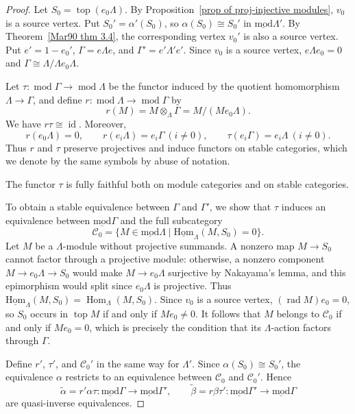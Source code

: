 \documentclass[11pt]{article}
\newcommand{\rad}{\operatorname{rad}}
\renewcommand{\top}{\operatorname{top}}
\newcommand{\Hom}{\operatorname{Hom}}
\renewcommand{\mod}{\operatorname{mod}}
\newcommand{\smod}{\operatorname{\underline{mod}}}
\newcommand{\sHom}{\operatorname{\underline{Hom}}}
\newcommand{\id}{\operatorname{id}}
\providecommand{\varLambda}{\Lambda}
\providecommand{\varGamma}{\Gamma}
\theoremstyle{definition}
\begin{document}
		\begin{proof}
			Let $S_0=\top(e_0\varLambda)$.
			By Proposition~\ref{prop of proj-injective modules}, $v_0$ is a source vertex.
			Put $S_0'=\alpha'(S_0)$, so $\alpha(S_0)\cong S_0'$ in $\smod\varLambda'$.
			By Theorem~\ref{Mar90 thm 3.4}, the corresponding vertex $v_0'$ is also a source vertex.
			Put $e'=1-e_0'$, $\varGamma=e\varLambda e$, and $\varGamma'=e'\varLambda'e'$.
			Since $v_0$ is a source vertex, $e\varLambda e_0=0$ and $\varGamma\cong \varLambda/\varLambda e_0\varLambda$.

			Let $\tau\colon\mod \varGamma\to\mod\varLambda$ be the functor induced by the quotient homomorphism $\varLambda\to \varGamma$, and define $r\colon\mod\varLambda\to\mod \varGamma$ by
			\[
				r(M)=M\otimes_{\varLambda} \varGamma=M/(Me_0\varLambda).
			\]
			We have $r\tau\cong\id$.
			Moreover,
			\[
				r(e_0\varLambda)=0,\qquad r(e_i\varLambda)=e_i\varGamma\ (i\ne0),\qquad
				\tau(e_i\varGamma)=e_i\varLambda\ (i\ne0).
			\]
			Thus $r$ and $\tau$ preserve projectives and induce functors on stable categories, which we denote by the same symbols by abuse of notation.

			The functor $\tau$ is fully faithful both on module categories and on stable categories.

			To obtain a stable equivalence between $\varGamma$ and $\varGamma'$, we show that $\tau$ induces an equivalence between $\smod \varGamma$ and the full subcategory
			\[
				\mathcal C_0=\{M\in\smod \varLambda\mid\sHom_{\varLambda}(M,S_0)=0\}.
			\]
			Let $M$ be a $\varLambda$-module without projective summands.
			A nonzero map $M\to S_0$ cannot factor through a projective module: otherwise, a nonzero component $M\to e_0\varLambda\to S_0$ would make $M\to e_0\varLambda$ surjective by Nakayama's lemma, and this epimorphism would split since $e_0\varLambda$ is projective.
			Thus $\sHom_{\varLambda}(M,S_0)=\Hom_{\varLambda}(M,S_0)$.
			Since $v_0$ is a source vertex, $(\rad M)e_0=0$, so $S_0$ occurs in $\top M$ if and only if $Me_0\ne0$.
			It follows that $M$ belongs to $\mathcal C_0$ if and only if $Me_0=0$, which is precisely the condition that its $\varLambda$-action factors through $\varGamma$.

			Define $r'$, $\tau'$, and $\mathcal C_0'$ in the same way for $\varLambda'$.
			Since $\alpha(S_0)\cong S_0'$, the equivalence $\alpha$ restricts to an equivalence between $\mathcal C_0$ and $\mathcal C_0'$.
			Hence
			\[
				\widetilde\alpha=r'\alpha\tau\colon\smod \varGamma\to\smod \varGamma',
				\qquad
				\widetilde\beta=r\beta\tau'\colon\smod \varGamma'\to\smod \varGamma
			\]
			are quasi-inverse equivalences.
		\end{proof}
\end{document}
